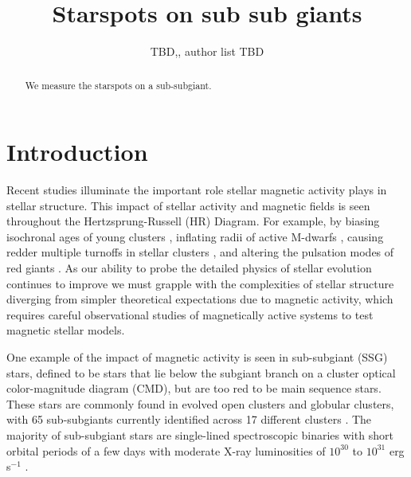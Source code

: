 \documentclass[twocolumn]{emulateapj}%
\begin{document}
\title{Starspots on sub sub giants }

\author{TBD,, author list TBD}



\begin{abstract}

We measure the starspots on a sub-subgiant.

\end{abstract}


\maketitle

\section{Introduction}\label{sec:intro}
Recent studies illuminate the important role stellar magnetic activity plays in stellar structure. This impact of stellar activity and magnetic fields is seen throughout the Hertzsprung-Russell (HR) Diagram. For example, by biasing isochronal ages of young clusters \citep{somers15}, inflating radii of active M-dwarfs \citep{2010AJ....140.1158T,2010ApJ...718..502M,2019MNRAS.483.1125J}, causing redder multiple turnoffs in stellar clusters \citep{2009MNRAS.398L..11B,2019ApJ...876..113S}, and altering the pulsation modes of red giants \citep{2020A&A...639A..63G}. As our ability to probe the detailed physics of stellar evolution continues to improve we must grapple with the complexities of stellar structure diverging from simpler theoretical expectations due to magnetic activity, which requires careful observational studies of magnetically active systems to test magnetic stellar models.

One example of the impact of magnetic activity is seen in sub-subgiant (SSG) stars, defined to be stars that lie below the subgiant branch on a cluster optical color-magnitude diagram (CMD), but are too red to be main sequence stars. These stars are commonly found in evolved open clusters and globular clusters, with 65 sub-subgiants currently identified across 17 different clusters \citep{geller17}. The majority of sub-subgiant stars are single-lined spectroscopic binaries with short orbital periods of a few days with moderate X-ray luminosities of $10^{30}$ to $10^{31}$ erg s$^{-1}$ \citep[and references therein]{geller17}.
\end{document}

